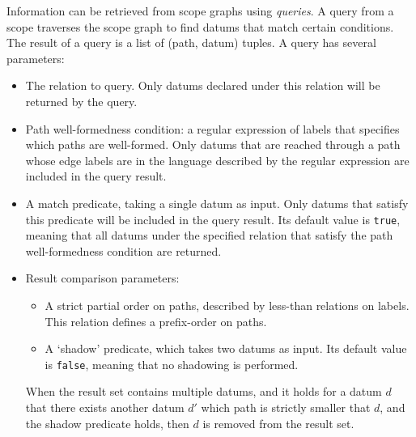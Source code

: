 Information can be retrieved from scope graphs using \textit{queries}. A query from a scope traverses the scope graph to find datums that match certain conditions. The result of a query is a list of (path, datum) tuples. A query has several parameters:
\begin{itemize}
	\item The relation to query. Only datums declared under this relation will be returned by the query.
	\item Path well-formedness condition: a regular expression of labels that specifies which paths are well-formed. Only datums that are reached through a path whose edge labels are in the language described by the regular expression are included in the query result.
	\item A match predicate, taking a single datum as input. Only datums that satisfy this predicate will be included in the query result. Its default value is \verb|true|, meaning that all datums under the specified relation that satisfy the path well-formedness condition are returned.
	\item Result comparison parameters:
	\begin{itemize}
		\item A strict partial order on paths, described by less-than relations on labels. This relation defines a prefix-order on paths.
		\item A `shadow' predicate, which takes two datums as input. Its default value is \verb|false|, meaning that no shadowing is performed.
	\end{itemize}
	When the result set contains multiple datums, and it holds for a datum $d$ that there exists another datum $d'$ which path is strictly smaller that $d$, and the shadow predicate holds, then $d$ is removed from the result set.
\end{itemize}
